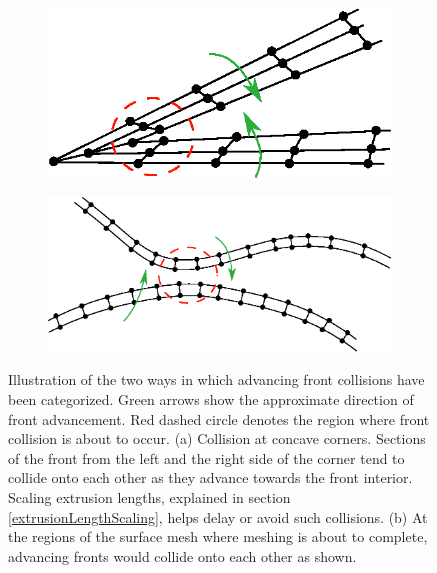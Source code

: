 \begin{figure}
	\centering
	\begin{subfigure}{0.5\textwidth}
		\includegraphics[width=0.9\linewidth]{img/m2/cornerCollision/cornerCollisionIllustration.eps}
		\caption{}
		\label{fig-cornerCollisionIllustration}
	\end{subfigure}%
	\begin{subfigure}{0.5\textwidth}
		\includegraphics[width =0.9\linewidth]{img/m2/headOnCollision/headOnCollisionIllustration.eps}
		\caption{}
		\label{fig-headOnCollisionIllustration}
	\end{subfigure}
	\caption[Two ways of front collision --- corner collision and head on collision.]{Illustration of the two ways in which advancing front collisions have been categorized. Green arrows show the approximate direction of front advancement. Red dashed circle denotes the region where front collision is about to occur. (a) Collision at concave corners. Sections of the front from the left and the right side of the corner tend to collide onto each other as they advance towards the front interior. Scaling extrusion lengths, explained in section \ref{extrusionLengthScaling}, helps delay or avoid such collisions. (b) At the regions of the surface mesh where meshing is about to complete, advancing fronts would collide onto each other as shown.}
	\label{fig-collisionIllustration}
\end{figure}

